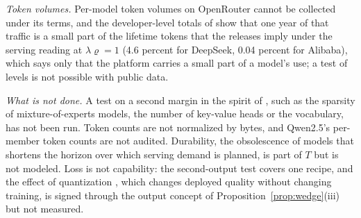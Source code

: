 \textit{Token volumes.} Per-model token volumes on OpenRouter cannot be collected under its terms, and the
developer-level totals of \citet{aubakirova2026state} show that one year of that traffic is a small part of the lifetime
tokens that the releases imply under the serving reading at $\lambda\varrho=1$ (4.6 percent for DeepSeek, 0.04 percent for
Alibaba), which says only that the platform carries a small part of a model's use; a test of levels is not possible with
public data.

\textit{What is not done.} A test on a second margin in the spirit of \citet{raval2023testing}, such as the sparsity of
mixture-of-experts models, the number of key-value heads or the vocabulary, has not been run. Token counts are not
normalized by bytes, and Qwen2.5's per-member token counts are not audited. Durability, the obsolescence of models that
shortens the horizon over which serving demand is planned, is part of $T$ but is not modeled. Loss is not capability: the
second-output test covers one recipe, and the effect of quantization \citep{kumar2024scaling}, which changes deployed
quality without changing training, is signed through the output concept of Proposition~\ref{prop:wedge}(iii) but not
measured.



\FloatBarrier%
